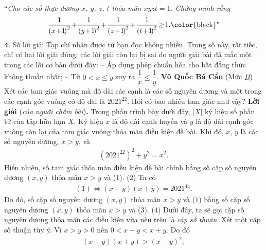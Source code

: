 \begin{multicols}{2}
	\vskip 0.05cm
	``\textit{Cho các số thực dương $x$, $y$, $z$, $t$ thỏa mãn $xyzt = 1$. Chứng minh rằng}
	\begin{align*}
		\frac{1}{{{{\left( {x \!+\! 1} \!\right)}^2}}} \!+\! \frac{1}{{{{\left( {y \!+\! 1} \!\right)}^2}}} \!+\! \frac{1}{{{{\left( {z \!+\! 1}\! \right)}^2}}} \!+\! \frac{1}{{{{\left( {t \!+\! 1}\! \right)}^2}}} \!\ge\! 1. \text{\color{black}"}
	\end{align*}
	$\pmb{4.}$ Số lời giải Tạp chí nhận được từ bạn đọc không nhiều. Trong số này, rất tiếc, chỉ có hai lời giải đúng; các lời giải còn lại bị sai do người giải bài đã mắc một trong các lỗi cơ bản dưới đây:
	\vskip 0.05cm
	-- Áp dụng phép chuẩn hóa cho bất đẳng thức không thuần nhất;
	\vskip 0.05cm
	-- Từ $0 < x \le y$ suy ra  $\dfrac{1}{x} \le \dfrac{1}{y}$.
	\vskip 0.05cm 
	\hfill \textbf{\color{thachthuctoanhoc}Võ Quốc Bá Cẩn}
	\vskip 0.05cm
	{}
	(Mức $B$) Xét các tam giác vuông mà độ dài các cạnh là các số nguyên dương và một trong các cạnh góc vuông có độ dài là $2021^{22}$. Hỏi có bao nhiêu tam giác như vậy? 
	\vskip 0.05cm
	\textbf{\color{thachthuctoanhoc}Lời giải} (\textit{của người chấm bài})\textbf{\color{thachthuctoanhoc}.}
	\vskip 0.05cm
	Trong phần trình bày dưới đây, $|X|$ ký hiệu số phần tử của tập hữu hạn $X$.
	\vskip 0.05cm
	Ký hiệu $x$ là độ dài cạnh huyền và $y$ là độ dài cạnh góc vuông còn lại của tam giác vuông thỏa mãn điều kiện đề bài. Khi đó, $x$, $y$ là các số nguyên dương, $x > y$, và
	\begin{align*}
		{\left( {{{2021}^{22}}} \right)^2} + {y^2} = {x^2}. \tag{$1$}
	\end{align*}
	Hiển nhiên, số tam giác thỏa mãn điều kiện đề bài chính bằng số cặp số nguyên dương $(x, y)$ thỏa mãn $x > y$ và ($1$). \hfill ($2$)
	\vskip 0.05cm
	Ta có
	\begin{align*}
		(1) \Leftrightarrow \left( {x - y} \right)\left( {x + y} \right) = {2021^{44}}. \tag{$3$}
	\end{align*}
	Do đó, số cặp số nguyên dương $(x, y)$ thỏa mãn $x > y$ và ($1$) bằng số cặp số nguyên dương $(x, y)$ thỏa mãn $x > y$ và ($3$). \hfill ($4$)
	\vskip 0.05cm
	Dưới đây, ta sẽ gọi cặp số nguyên dương thỏa mãn các điều kiện vừa nêu trên là \textit{cặp số thuận}.
	\vskip 0.05cm
	Xét một cặp số thuận tùy ý. Vì $x > y > 0$ nên  $0 < x - y < x + y$. Do đó
	\begin{align*}
		\left( {x - y} \right)\left( {x + y} \right) > {\left( {x - y} \right)^2};
	\end{align*}

\end{multicols}
